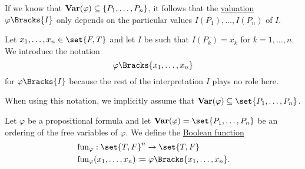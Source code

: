 \begin{remark}\label{rem:propositional_formula_valuation_without_variable_assignment}
  If we know that \( \operatorname{\mathbf{Var}}(\varphi) \subseteq \{ P_1, \ldots, P_n \} \), it follows that the \hyperref[def:first_order_valuation/formula_valuation]{valuation} \( \varphi\Bracks{I} \) only depends on the particular values \( I(P_1), \ldots, I(P_n) \) of \( I \).

  Let \( x_1, \ldots, x_n \in \set{ F, T } \) and let \( I \) be such that \( I(P_k) = x_k \) for \( k = 1, \ldots, n \). We introduce the notation
  \begin{equation}\label{eq:rem:propositional_formula_valuation_without_variable_assignment/short}
    \varphi\Bracks{x_1, \ldots, x_n}
  \end{equation}
  for \( \varphi\Bracks{I} \) because the rest of the interpretation \( I \) plays no role here.

  When using this notation, we implicitly assume that \( \boldop{Var}(\varphi) \subseteq \set{ P_1, \ldots, P_n } \).
\end{remark}

\begin{definition}\label{def:propositional_formula_induced_function}
  Let \( \varphi \) be a propositional formula and let \( \boldop{Var}(\varphi) = \set{ P_1, \ldots, P_n } \) be an ordering of the free variables of \( \varphi \). We define the \hyperref[def:boolean_function]{Boolean function}
  \begin{equation}\label{eq:def:propositional_formula_induced_function}
    \begin{aligned}
      &\fun_\varphi: \set{ T, F }^n \to \set{ T, F } \\
      &\fun_\varphi(x_1, \ldots, x_n) \coloneqq \varphi\Bracks{x_1, \ldots, x_n}.
    \end{aligned}
  \end{equation}
\end{definition}

